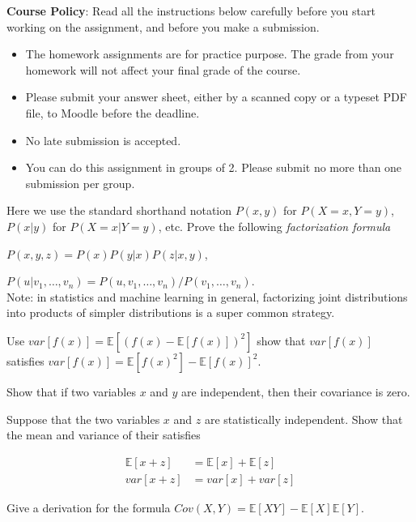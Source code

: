 \documentclass[a4 paper]{article}
\begin{document}
\textbf{Course Policy}: Read all the instructions below carefully before you start working on the assignment, and before you make a submission.
\begin{itemize}
    \item The homework assignments are for practice purpose. The grade from your homework will not affect your final grade of the course.
    \item Please submit your answer sheet, either by a scanned copy or a typeset PDF file, to Moodle before the deadline.
    \item No late submission is accepted.
    \item You can do this assignment in groups of 2. Please submit no more than one submission per group.
\end{itemize}

Here we use the standard shorthand notation $P(x,y)$ for $P(X=x, Y=y)$, $P(x|y)$ for $P(X=x | Y=y)$, etc. Prove the following \textit{factorization formula}

 $P(x, y, z) = P(x)P(y|x)P(z|x,y)$,

 $P(u|v_1,\dots, v_n) = P(u, v_1,\dots, v_n) / P(v_1, \dots, v_n)$.\\

Note: in statistics and machine learning in general, factorizing joint distributions into products of simpler distributions is a super common strategy.


 Use $var[f(x)]=\mathbb{E}[(f(x)-\mathbb{E}[f(x)])^2]$ show that $var[f(x)]$ satisfies $var[f(x)]=\mathbb{E}[f(x)^2] - \mathbb{E}[f(x)]^2$.

 Show that if two variables $x$ and $y$ are independent, then their covariance is zero.

 Suppose that the two variables $x$ and $z$ are statistically independent. Show that the mean and variance of their satisfies

\begin{align*}
    \mathbb{E}[x+z] &= \mathbb{E}[x]+\mathbb{E}[z]\\
    var[x+z] &= var[x]+var[z]
\end{align*}

 Give a derivation for the formula $Cov(X,Y)=\mathbb{E}[XY]-\mathbb{E}[X]\mathbb{E}[Y].$
\end{document}
